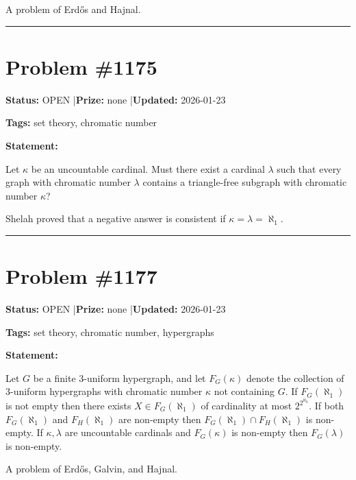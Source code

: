 \documentclass{article}
\begin{document}
A problem of Erd\H{o}s and Hajnal.

\noindent\rule{\linewidth}{0.4pt}


\section{Problem \#1175}
\label{prob:1175}

\noindent\textbf{Status:} OPEN \quad|\quad \textbf{Prize:} none \quad|\quad \textbf{Updated:} 2026-01-23

\noindent\textbf{Tags:} set theory, chromatic number

\medskip

\noindent\textbf{Statement:}

Let $\kappa$ be an uncountable cardinal. Must there exist a cardinal $\lambda$ such that every graph with chromatic number $\lambda$ contains a triangle-free subgraph with chromatic number $\kappa$?




Shelah proved that a negative answer is consistent if $\kappa=\lambda=\aleph_1$.

\noindent\rule{\linewidth}{0.4pt}


\section{Problem \#1177}
\label{prob:1177}

\noindent\textbf{Status:} OPEN \quad|\quad \textbf{Prize:} none \quad|\quad \textbf{Updated:} 2026-01-23

\noindent\textbf{Tags:} set theory, chromatic number, hypergraphs

\medskip

\noindent\textbf{Statement:}

Let $G$ be a finite $3$-uniform hypergraph, and let $F_G(\kappa)$ denote the collection of $3$-uniform hypergraphs with chromatic number $\kappa$ not containing $G$. If $F_G(\aleph_1)$ is not empty then there exists $X\in F_G(\aleph_1)$ of cardinality at most $2^{2^{\aleph_0}}$. If both $F_G(\aleph_1)$ and $F_H(\aleph_1)$ are non-empty then $F_G(\aleph_1)\cap F_H(\aleph_1)$ is non-empty. If $\kappa,\lambda$ are uncountable cardinals and $F_G(\kappa)$ is non-empty then $F_G(\lambda)$ is non-empty.




A problem of Erd\H{o}s, Galvin, and Hajnal.
\end{document}
